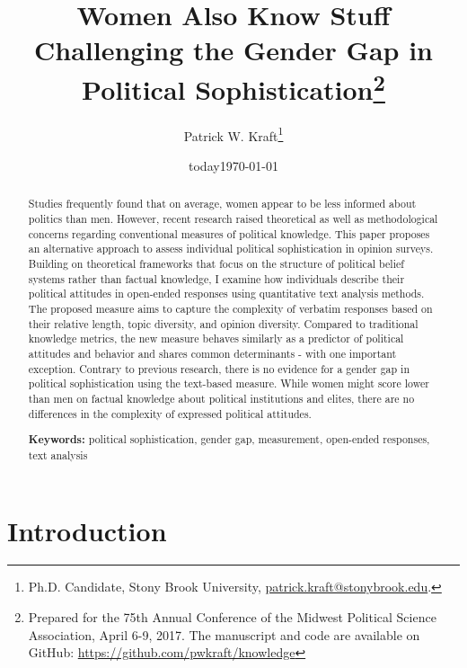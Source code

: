 \documentclass[12pt]{article}
\author{Patrick W. Kraft\footnote{Ph.D. Candidate, Stony Brook University, \href{mailto:patrick.kraft@stonybrook.edu}{patrick.kraft@stonybrook.edu}.
}}
\date{today}
\title{Women Also Know Stuff\\
\large{Challenging the Gender Gap in Political Sophistication}\footnote{Prepared for the 75th Annual Conference of the Midwest Political Science Association, April 6-9, 2017. The manuscript and code are available on GitHub: \url{https://github.com/pwkraft/knowledge}}
}
\date{\today}
\begin{document}
\maketitle\doublespacing\thispagestyle{empty}

\begin{abstract}\singlespacing
Studies frequently found that on average, women appear to be less informed about politics than men. However, recent research raised theoretical as well as methodological concerns regarding conventional measures of political knowledge. This paper proposes an alternative approach to assess individual political sophistication in opinion surveys. Building on theoretical frameworks that focus on the structure of political belief systems rather than factual knowledge, I examine how individuals describe their political attitudes in open-ended responses using quantitative text analysis methods. The proposed measure aims to capture the complexity of verbatim responses based on their relative length, topic diversity, and opinion diversity. Compared to traditional knowledge metrics, the new measure behaves similarly as a predictor of political attitudes and behavior and shares common determinants - with one important exception. Contrary to previous research, there is no evidence for a gender gap in political sophistication using the text-based measure. While women might score lower than men on factual knowledge about political institutions and elites, there are no differences in the complexity of expressed political attitudes. %

\vspace{\baselineskip}
\noindent \textbf{Keywords:} political sophistication, gender gap, measurement, open-ended responses, text analysis \\

\end{abstract}
\newpage\setcounter{page}{1}


\section*{Introduction}
\end{document}
